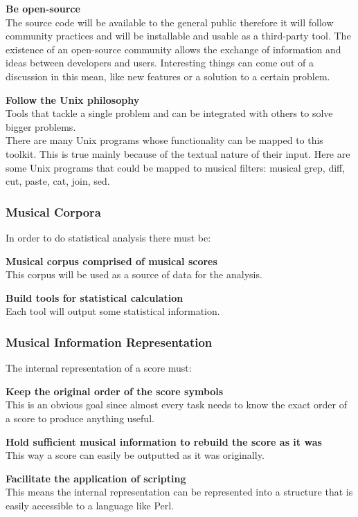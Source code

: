 \documentclass[main.tex]{subfiles}
\begin{document}
\begin{description}
  \item \textbf{Be open-source} \hfill\\
    The source code will be available to the general public therefore it will follow community
    practices and will be installable and usable as a third-party tool.
    The existence of an open-source community allows the exchange of information and ideas between
    developers and users. Interesting things can come out of a discussion in this mean, like new
    features or a solution to a certain problem.
  \item \textbf{Follow the Unix philosophy} \hfill\\
    Tools that tackle a single problem and can be integrated with others to solve bigger problems.\\
    There are many Unix programs whose functionality can be mapped to this toolkit. This is true
    mainly because of the textual nature of their input. Here are some Unix programs that could be
    mapped to musical filters: musical grep, diff, cut, paste, cat, join, sed.
\end{description}

\subsubsection{Musical Corpora}

In order to do statistical analysis there must be:
\begin{description}
  \item \textbf{Musical corpus comprised of musical scores} \hfill\\
    This corpus will be used as a source of data for the analysis.
  \item \textbf{Build tools for statistical calculation} \hfill\\
    Each tool will output some statistical information.
\end{description}

\subsubsection{Musical Information Representation}

The internal representation of a score must:
\begin{description}
  \item \textbf{Keep the original order of the score symbols} \hfill\\
    This is an obvious goal since almost every task needs to know the exact order of a score to
    produce anything useful.
  \item \textbf{Hold sufficient musical information to rebuild the score as it was} \hfill\\
    This way a score can easily be outputted as it was originally.
  \item \textbf{Facilitate the application of scripting} \hfill\\
    This means the internal representation can be represented into a structure that is easily
    accessible to a language like Perl.
\end{description}
\end{document}

